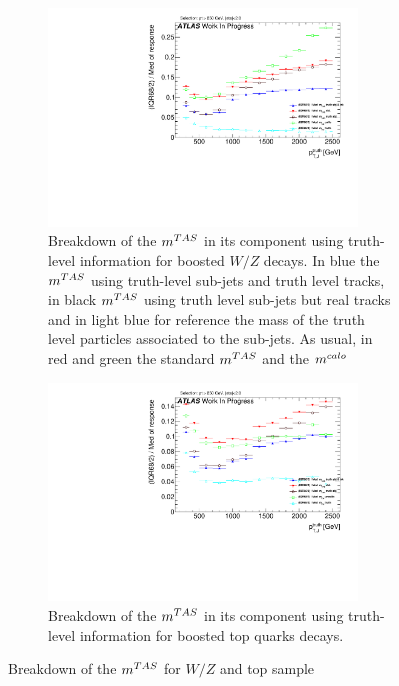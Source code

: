 \begin{figure}
    \centering
    \begin{subfigure}[b]{0.45\textwidth}
  \centering
      \includegraphics[width=0.9\textwidth]{jet_part/calib/71graphcftr_h_JetRatio_mJ12CALOIQRoM4Truths.pdf}
  \caption[Breakdown of the $\mtas$ ]{Breakdown of the $\mtas$ in its component using truth-level information for boosted $W/Z$ decays. In blue the $\mtas$ using truth-level sub-jets and truth level tracks, in black $\mtas$ using truth level sub-jets but real tracks and in light blue for reference the mass of the truth level particles associated to the sub-jets. As usual, in red and green the standard $\mtas$ and the $m^{calo}$}
  \label{fig:breakdown2}
    \end{subfigure}
    \begin{subfigure}[b]{0.45\textwidth}
  \centering
      \includegraphics[width=0.9\textwidth]{jet_part/appendixA/71graphcftr_h_JetRatio_mJ12CALOIQRoM4TruthsTops.pdf}
  \caption[Breakdown of the $\mtas$ ]{Breakdown of the $\mtas$ in its component using truth-level information for boosted top quarks decays.}
  \label{fig:breakdown3}
 
    \end{subfigure}
    \caption[Breakdown of the $\mtas$]{Breakdown of the $\mtas$ for $W/Z$ and top sample} 
\end{figure}

